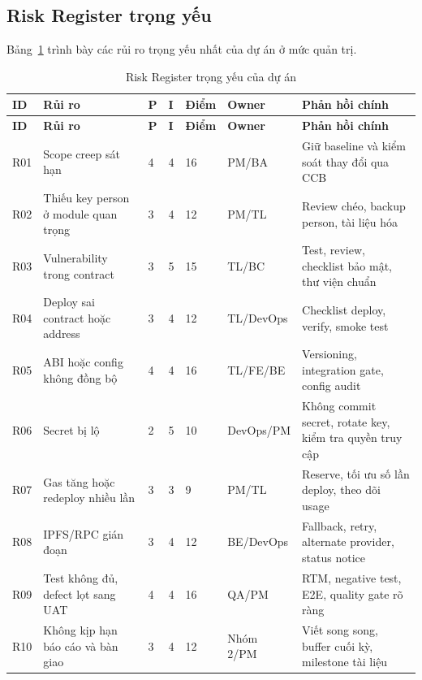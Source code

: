 \subsection{Risk Register trọng yếu}

Bảng~\ref{tab:risk-register} trình bày các rủi ro trọng yếu nhất của dự án ở mức quản trị.

\begin{longtable}{| p{1.1cm} | p{3.3cm} | p{1cm} | p{1cm} | p{1.2cm} | p{2.2cm} | p{3.2cm} |}
\caption{Risk Register trọng yếu của dự án}\label{tab:risk-register}\\
\hline
\textbf{ID} & \textbf{Rủi ro} & \textbf{P} & \textbf{I} & \textbf{Điểm} & \textbf{Owner} & \textbf{Phản hồi chính} \\
\hline
\endfirsthead
\hline
\textbf{ID} & \textbf{Rủi ro} & \textbf{P} & \textbf{I} & \textbf{Điểm} & \textbf{Owner} & \textbf{Phản hồi chính} \\
\hline
\endhead
R01 & Scope creep sát hạn & 4 & 4 & 16 & PM/BA & Giữ baseline và kiểm soát thay đổi qua CCB \\ \hline
R02 & Thiếu key person ở module quan trọng & 3 & 4 & 12 & PM/TL & Review chéo, backup person, tài liệu hóa \\ \hline
R03 & Vulnerability trong contract & 3 & 5 & 15 & TL/BC & Test, review, checklist bảo mật, thư viện chuẩn \\ \hline
R04 & Deploy sai contract hoặc address & 3 & 4 & 12 & TL/DevOps & Checklist deploy, verify, smoke test \\ \hline
R05 & ABI hoặc config không đồng bộ & 4 & 4 & 16 & TL/FE/BE & Versioning, integration gate, config audit \\ \hline
R06 & Secret bị lộ & 2 & 5 & 10 & DevOps/PM & Không commit secret, rotate key, kiểm tra quyền truy cập \\ \hline
R07 & Gas tăng hoặc redeploy nhiều lần & 3 & 3 & 9 & PM/TL & Reserve, tối ưu số lần deploy, theo dõi usage \\ \hline
R08 & IPFS/RPC gián đoạn & 3 & 4 & 12 & BE/DevOps & Fallback, retry, alternate provider, status notice \\ \hline
R09 & Test không đủ, defect lọt sang UAT & 4 & 4 & 16 & QA/PM & RTM, negative test, E2E, quality gate rõ ràng \\ \hline
R10 & Không kịp hạn báo cáo và bàn giao & 3 & 4 & 12 & Nhóm 2/PM & Viết song song, buffer cuối kỳ, milestone tài liệu \\
\hline
\end{longtable}

